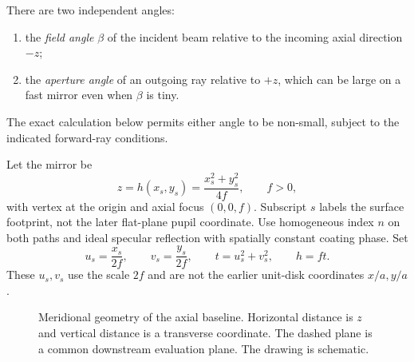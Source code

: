 \documentclass[11pt,a4paper]{article}
\numberwithin{equation}{section}
\begin{document}
There are two independent angles:
\begin{enumerate}
 \item the \emph{field angle} $\beta$ of the incident beam relative to the
 incoming axial direction $-z$;
 \item the \emph{aperture angle} of an outgoing ray relative to $+z$,
 which can be large on a fast mirror even when $\beta$ is tiny.
\end{enumerate}
The exact calculation below permits either angle to be non-small, subject
to the indicated forward-ray conditions.

Let the mirror be
\begin{equation}
 z=h(x_s,y_s)=\frac{x_s^2+y_s^2}{4f},\qquad f>0,
 \label{eq:parab-sag}
\end{equation}
with vertex at the origin and axial focus $(0,0,f)$. Subscript $s$ labels
the surface footprint, not the later flat-plane pupil coordinate.
Use homogeneous index $n$ on both paths and ideal specular reflection
with spatially constant coating phase.
Set
\begin{equation}
 u_s=\frac{x_s}{2f},\qquad v_s=\frac{y_s}{2f},\qquad
 t=u_s^2+v_s^2,\qquad h=ft.
 \label{eq:mirror-parameters}
\end{equation}
These $u_s,v_s$ use the scale $2f$ and are not the earlier unit-disk
coordinates $x/a,y/a$.

\begin{figure}[htbp]
\centering
{}
\caption{Meridional geometry of the axial baseline. Horizontal distance is
$z$ and vertical distance is a transverse coordinate. The dashed plane is
a common downstream evaluation plane. The drawing is schematic.}
\end{figure}
\end{document}
